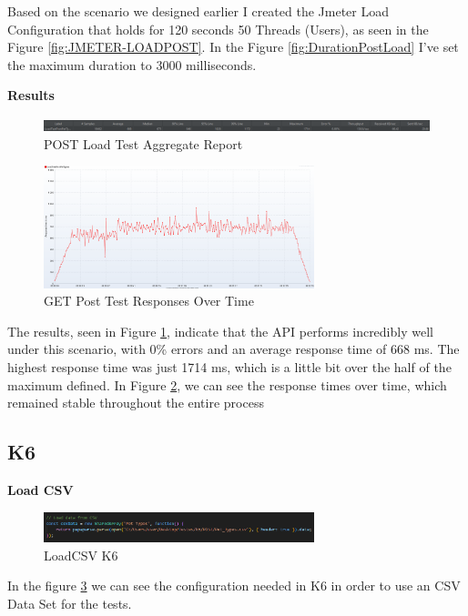 \documentclass[a4paper,11pt,openright,BCOR=15mm]{scrbook}
\begin{document}
		Based on the scenario we designed earlier I created the Jmeter Load Configuration that holds for 120 seconds 50 Threads (Users), as seen in the Figure \ref{fig:JMETER-LOADPOST}. In the Figure \ref{fig:DurationPostLoad} I've set the maximum duration to 3000 milliseconds.



		\textbf{Results}
		\begin{figure}[H]
			\centering
			\includegraphics[width=\textwidth]{figs/Performance/Results/JMETER POST LOAD AR.png}
			\caption{POST Load Test Aggregate Report}
			\label{fig:PostLoadAggregateReport}
		\end{figure}
		\begin{figure}[H]
			\centering
			\includegraphics[width=0.7\textwidth]{figs/Performance/Results/JMETER POST LOAD ROT.png}
			\caption{GET Post Test Responses Over Time}
			\label{fig:GETPostResposesOverTime}
		\end{figure}
		The results, seen in Figure \ref{fig:PostLoadAggregateReport}, indicate that the API performs incredibly well under this scenario, with 0\% errors and an average response time of 668 ms. The highest response time was just 1714 ms, which is a little bit over the half of the maximum defined.
		In Figure \ref{fig:GETPostResposesOverTime}, we can see the response times over time, which remained stable throughout the entire process		


		\subsection{K6}

		\textbf{Load CSV}
		\begin{figure}[H]
			\centering
			\includegraphics[width=0.7\textwidth]{figs/Performance/Test Configuration/LoadCSV-K6.png}
			\caption{LoadCSV K6}
			\label{fig:LoadCSV K6}
		\end{figure}
		In the figure \ref{fig:LoadCSV K6} we can see the configuration needed in K6 in order to use an CSV Data Set for the tests.
\end{document}
